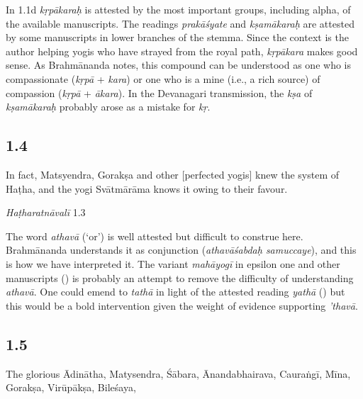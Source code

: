 \begin{ekdosis}
\begin{philcomm}[hp01_003]
In 1.1d \emph{kṛpākaraḥ} is attested by the most important groups, including alpha, of the available manuscripts. The readings \emph{prakāśyate} and \emph{kṣamākaraḥ} are attested by some manuscripts in lower branches of the stemma. Since the context is the author helping yogis who have strayed from the royal path, \emph{kṛpākara} makes good sense. As Brahmānanda notes, this compound can be understood as one who is compassionate (\emph{kṛpā} + \emph{kara}) or one who is a mine (i.e., a rich source) of compassion (\emph{kṛpā} + \emph{ākara}). In the Devanagari transmission, the \emph{kṣa} of \emph{kṣamākaraḥ} probably arose as a mistake for \emph{kṛ}.       
\end{philcomm}

\subsection*{1.4}
\begin{translation}[hp01_004]
In fact, Matsyendra, Gorakṣa and other [perfected yogis] knew the system of Haṭha, and the yogi Svātmārāma knows it owing to their favour.
\end{translation}

\begin{testimonia}[hp01_004]
\emph{Haṭharatnāvalī} 1.3

\begin{versinnote}
\end{versinnote}

\end{testimonia}

\begin{philcomm}[hp01_004]   
The word \emph{athavā} (‘or’) is well attested but difficult to construe here. Brahmānanda understands it as conjunction (\emph{athavāśabdaḥ samuccaye}), and this is how we have interpreted it. The variant \emph{mahāyogī} in epsilon one and other manuscripts () is probably an attempt to remove the difficulty of understanding \emph{athavā}. One could emend to \emph{tathā} in light of the attested reading \emph{yathā} () but this would be a bold intervention given the weight of evidence supporting \emph{’thavā}.   
\end{philcomm}

\subsection*{1.5}
\begin{translation}[hp01_005]
The glorious Ādinātha, Matysendra, Śābara, Ānandabhairava, Cauraṅgī, Mīna, Gorakṣa, Virūpākṣa, Bileśaya,
\end{translation}


\end{ekdosis}
